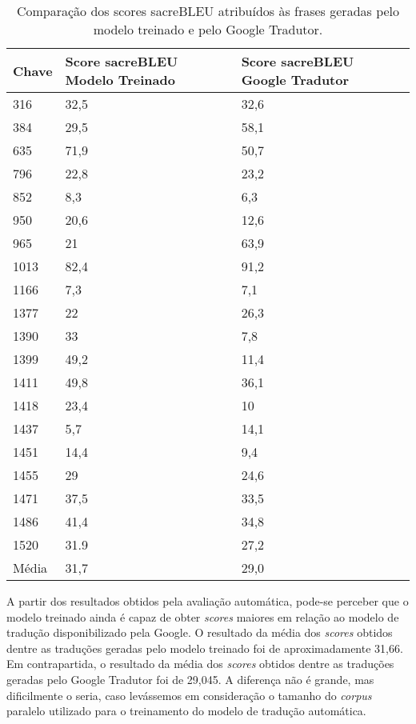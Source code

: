 \documentclass[portuguese]{textolivre}
\begin{document}
\begin{table}[!htpb]
\centering
\begin{threeparttable}
\caption{Comparação dos scores sacreBLEU atribuídos às frases geradas pelo modelo treinado e pelo Google Tradutor.}
\label{tab-02}
\begin{tabular}{lll}
\toprule
Chave & \multicolumn{1}{p{3cm}}{Score sacreBLEU Modelo Treinado} & \multicolumn{1}{p{3cm}}{Score sacreBLEU Google Tradutor} \\
\midrule
316 & 32,5 & 32,6 \\
384 & 29,5 & 58,1 \\
635 & 71,9 & 50,7 \\
796 & 22,8 & 23,2 \\
852 & 8,3 & 6,3 \\
950 & 20,6 & 12,6 \\
965 & 21 & 63,9 \\
1013 & 82,4 & 91,2 \\
1166 & 7,3 & 7,1 \\
1377 & 22 & 26,3 \\
1390 & 33 & 7,8 \\
1399 & 49,2 & 11,4 \\
1411 & 49,8 & 36,1 \\
1418 & 23,4 & 10 \\
1437 & 5,7 & 14,1 \\
1451 & 14,4 & 9,4 \\
1455 & 29 & 24,6 \\
1471 & 37,5 & 33,5 \\
1486 & 41,4 & 34,8 \\
1520 & 31.9 & 27,2 \\
Média & 31,7 & 29,0 \\
\bottomrule
\end{tabular}
\end{threeparttable}
\end{table}


A partir dos resultados obtidos pela avaliação automática, pode-se perceber que o modelo treinado ainda é capaz de obter \textit{scores} maiores em relação ao modelo de tradução disponibilizado pela Google. O resultado da média dos \textit{scores} obtidos dentre as traduções geradas pelo modelo treinado foi de aproximadamente 31,66. Em contrapartida, o resultado da média dos \textit{scores} obtidos dentre as traduções geradas pelo Google Tradutor foi de 29,045. A diferença não é grande, mas dificilmente o seria, caso levássemos em consideração o tamanho do \textit{corpus} paralelo utilizado para o treinamento do modelo de tradução automática.
\end{document}
